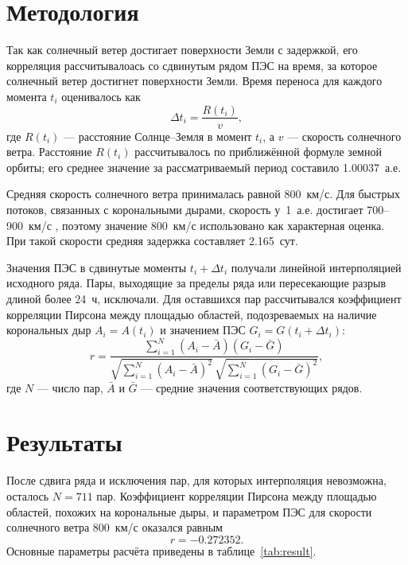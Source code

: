 \documentclass[11pt,a4paper]{article}
\begin{document}
\section{Методология}

Так как солнечный ветер достигает поверхности Земли с задержкой, его корреляция
рассчитывалоась со сдвинутым рядом ПЭС на время, за которое солнечный ветер
достигнет поверхности Земли. Время переноса для каждого момента $t_i$
оценивалось как
\begin{equation}
\Delta t_i = \frac{R(t_i)}{v},
\label{eq:delay}
\end{equation}
где $R(t_i)$ --- расстояние Солнце--Земля в момент $t_i$, а $v$ --- скорость
солнечного ветра. Расстояние $R(t_i)$ рассчитывалось по приближённой формуле
земной орбиты; его среднее значение за рассматриваемый период составило
1.00037~а.е.

Средняя скорость солнечного ветра принималась равной 800~км/с. Для быстрых
потоков, связанных с корональными дырами, скорость у~1~а.е. достигает
700--900~км/с \citep{cranmer2019properties}, поэтому значение 800~км/с
использовано как характерная оценка. При такой скорости средняя задержка
составляет 2.165~сут.

Значения ПЭС в сдвинутые моменты $t_i+\Delta t_i$ получали линейной
интерполяцией исходного ряда. Пары, выходящие за пределы ряда или
пересекающие разрыв длиной более 24~ч, исключали. Для оставшихся пар
рассчитывался коэффициент корреляции Пирсона между площадью областей, подозреваемых на наличие 
корональных дыр
$A_i=A(t_i)$ и значением ПЭС $G_i=G(t_i+\Delta t_i)$:
\begin{equation}
r = \frac{\sum_{i=1}^{N}(A_i-\bar{A})(G_i-\bar{G})}
{\sqrt{\sum_{i=1}^{N}(A_i-\bar{A})^2}\,
 \sqrt{\sum_{i=1}^{N}(G_i-\bar{G})^2}},
\label{eq:pearson}
\end{equation}
где $N$ --- число пар, $\bar{A}$ и $\bar{G}$ --- средние значения
соответствующих рядов.

\section{Результаты}

После сдвига ряда и исключения пар, для которых интерполяция невозможна,
осталось $N=711$ пар. Коэффициент корреляции Пирсона между площадью
областей, похожих на корональные дыры, и параметром ПЭС для скорости
солнечного ветра 800~км/с оказался равным
\begin{equation}
r = -0.272352.
\label{eq:result}
\end{equation}
Основные параметры расчёта приведены в таблице~\ref{tab:result}.
\end{document}
